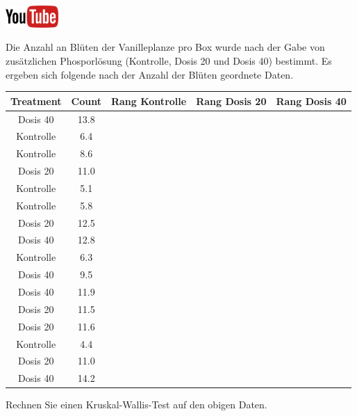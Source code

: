 \documentclass[a4paper, 9pt]{scrartcl}\usepackage[]{graphicx}\usepackage[]{xcolor}
\newenvironment{knitrout}{}{} %
\begin{document}
\hfill\href{https://youtu.be/gC0SXiIG2wQ}{\includegraphics[width =
  2cm]{img/youtube}} %
\hspace{2Ex}




Die Anzahl an Bl{\"u}ten der Vanilleplanze pro Box wurde nach der Gabe von
zus{\"a}tzlichen Phosporl{\"o}sung (Kontrolle, Dosis 20 und Dosis 40) bestimmt. Es
ergeben sich folgende nach der Anzahl der Bl{\"u}ten geordnete Daten.

\begin{knitrout}
\color{fgcolor}\begin{table}[!h]
\centering
\begin{tabular}{ccccc}
\toprule
Treatment & Count & Rang Kontrolle & Rang Dosis 20 & Rang Dosis 40\\
\midrule
Dosis 40 & 13.8 &  &  & \\
Kontrolle & 6.4 &  &  & \\
Kontrolle & 8.6 &  &  & \\
Dosis 20 & 11.0 &  &  & \\
Kontrolle & 5.1 &  &  & \\
\addlinespace
Kontrolle & 5.8 &  &  & \\
Dosis 20 & 12.5 &  &  & \\
Dosis 40 & 12.8 &  &  & \\
Kontrolle & 6.3 &  &  & \\
Dosis 40 & 9.5 &  &  & \\
\addlinespace
Dosis 40 & 11.9 &  &  & \\
Dosis 20 & 11.5 &  &  & \\
Dosis 20 & 11.6 &  &  & \\
Kontrolle & 4.4 &  &  & \\
Dosis 20 & 11.0 &  &  & \\
\addlinespace
Dosis 40 & 14.2 &  &  & \\
\bottomrule
\end{tabular}
\end{table}

\end{knitrout}

Rechnen Sie einen Kruskal-Wallis-Test auf den obigen Daten.
\end{document}

